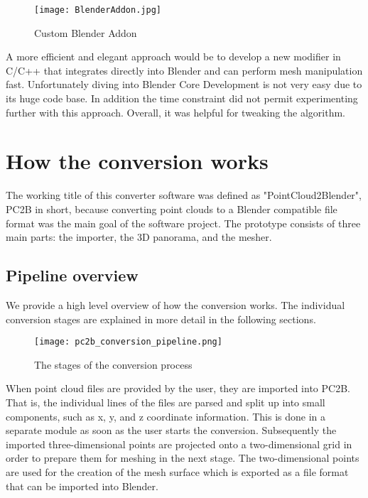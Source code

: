 \begin{figure}[h]
	\centering
	\texttt{[image: BlenderAddon.jpg]}
	\caption{Custom Blender Addon}
	\label{fig:blender_addon}
\end{figure}

A more efficient and elegant approach would be to develop a new modifier in C/C++ that integrates directly into Blender and can perform mesh manipulation fast. Unfortunately diving into Blender Core Development is not very easy due to its huge code base. In addition the time constraint did not permit experimenting further with this approach. Overall, it was helpful for tweaking the algorithm.

\pagebreak

\section{How the conversion works}

The working title of this converter software was defined as "PointCloud2Blender", PC2B in short, because converting point clouds to a Blender compatible file format was the main goal of the software project. The prototype consists of three main parts: the importer, the 3D panorama, and the mesher.


\subsection{Pipeline overview}

We provide a high level overview of how the conversion works. The individual conversion stages are explained in more detail in the following sections.

\begin{figure}[h]
	\centering
	\texttt{[image: pc2b\_conversion\_pipeline.png]}
	\caption{The stages of the conversion process}
	\label{fig:pc2b_conversion_pipeline}
\end{figure}

When point cloud files are provided by the user, they are imported into PC2B. That is, the individual lines of the files are parsed and split up into small components, such as x, y, and z coordinate information. This is done in a separate module as soon as the user starts the conversion. Subsequently the imported three-dimensional points are projected onto a two-dimensional grid in order to prepare them for meshing in the next stage. The two-dimensional points are used for the creation of the mesh surface which is exported as a file format that can be imported into Blender.

